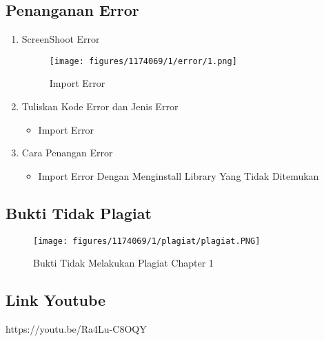 \subsection{Penanganan Error}
\begin{enumerate}
	\item ScreenShoot Error
	\begin{figure}[H]
		\texttt{[image: figures/1174069/1/error/1.png]}
		\centering
		\caption{Import Error}
	\end{figure}

	\item Tuliskan Kode Error dan Jenis Error
	\begin{itemize}
		\item Import Error
	\end{itemize}
	\item Cara Penangan Error
	\begin{itemize}
		\item Import Error
		\hfill\break
		Dengan Menginstall Library Yang Tidak Ditemukan
	\end{itemize}
\end{enumerate}

\subsection{Bukti Tidak Plagiat}
\begin{figure}[H]
	\texttt{[image: figures/1174069/1/plagiat/plagiat.PNG]}
	\centering
	\caption{Bukti Tidak Melakukan Plagiat Chapter 1}
\end{figure}

\subsection{Link Youtube}
https://youtu.be/Ra4Lu-C8OQY
